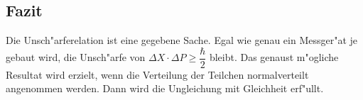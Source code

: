 \begin{refsection}
\subsection{Fazit}

Die Unsch"arferelation ist eine gegebene Sache. Egal wie genau ein Messger"at je gebaut wird, die Unsch"arfe von $\varDelta X \cdot \varDelta P \geq \dfrac{\hbar}{2}$ bleibt. Das genaust m"ogliche Resultat wird erzielt, wenn die Verteilung der Teilchen normalverteilt angenommen werden. Dann wird die Ungleichung mit Gleichheit erf"ullt.


\printbibliography[heading=subbibliography]
\end{refsection}

